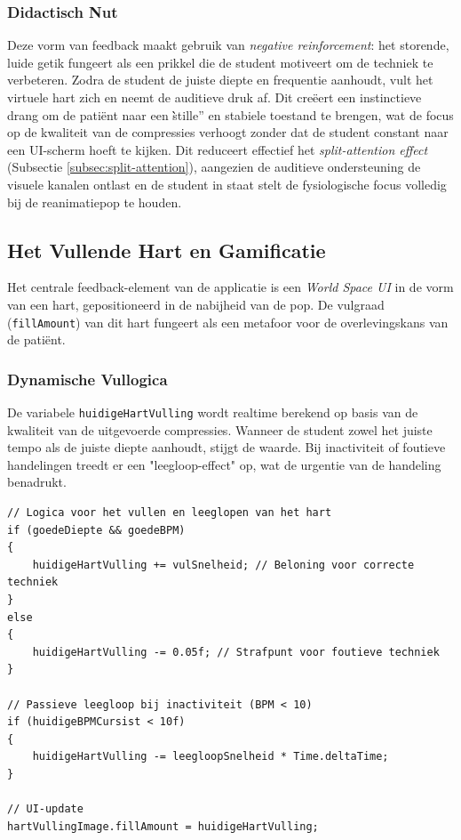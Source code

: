 \subsubsection{Didactisch Nut}
Deze vorm van feedback maakt gebruik van \textit{negative reinforcement}: het storende, luide getik fungeert als een prikkel die de student motiveert om de 
techniek te verbeteren. Zodra de student de juiste diepte en frequentie aanhoudt, vult het virtuele hart zich en neemt de auditieve druk af. Dit creëert een instinctieve drang om de patiënt naar een 
\`\`stille'' en stabiele toestand te brengen, wat de focus op de kwaliteit van de compressies verhoogt zonder dat de student constant naar een 
UI-scherm hoeft te kijken. Dit reduceert effectief het \textit{split-attention effect} (Subsectie \ref{subsec:split-attention}), aangezien 
de auditieve ondersteuning de visuele kanalen ontlast en de student in staat stelt de fysiologische focus volledig bij de reanimatiepop te houden.



\subsection{Het Vullende Hart en Gamificatie}
Het centrale feedback-element van de applicatie is een \textit{World Space UI} in de vorm van een hart, gepositioneerd in de nabijheid van de pop. 
De vulgraad (\texttt{fillAmount}) van dit hart fungeert als een metafoor voor de overlevingskans van de patiënt.

\subsubsection{Dynamische Vullogica}
De variabele \texttt{huidigeHartVulling} wordt realtime berekend op basis van de kwaliteit van de uitgevoerde compressies. Wanneer de student zowel het juiste tempo als de juiste diepte aanhoudt, stijgt de waarde. Bij inactiviteit of foutieve handelingen treedt er een "leegloop-effect" op, wat de urgentie van de handeling benadrukt.

\begin{listing}[htbp]
\begin{verbatim}
// Logica voor het vullen en leeglopen van het hart
if (goedeDiepte && goedeBPM) 
{
    huidigeHartVulling += vulSnelheid; // Beloning voor correcte techniek
} 
else 
{
    huidigeHartVulling -= 0.05f; // Strafpunt voor foutieve techniek
}

// Passieve leegloop bij inactiviteit (BPM < 10)
if (huidigeBPMCursist < 10f) 
{
    huidigeHartVulling -= leegloopSnelheid * Time.deltaTime;
}

// UI-update
hartVullingImage.fillAmount = huidigeHartVulling;
\end{verbatim}
\caption{Dynamische vullogica en leegloopeffect van het virtuele hart.}
\label{lst:hart_vullogica}
\end{listing}

